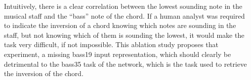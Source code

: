 
Intuitively, there is a clear correlation between the lowest
sounding note in the musical staff and the ``bass'' note of
the chord. If a human analyst was required to indicate the
inversion of a chord knowing which notes are sounding in the
staff, but not knowing which of them is sounding the lowest,
it would make the task very difficult, if not impossible.
This ablation study proposes that experiment, a missing
\gls{bass19} input representation, which should clearly be
detrimental to the \gls{bass35} task of the network, which
is the task used to retrieve the inversion of the chord.
